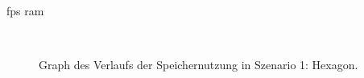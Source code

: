 \documentclass[12pt,a4paper,listof=totocnumbered,parskip=half, abstract=yes]{scrartcl}
\begin{document}
\ac{fps} \ac{ram}\\

\begin{figure}[!htbp]
	\\
	\caption{Graph des Verlaufs der Speichernutzung in Szenario 1: Hexagon.}\label{fig:seed-0-hexagon-mem}
\end{figure} 
\end{document}
